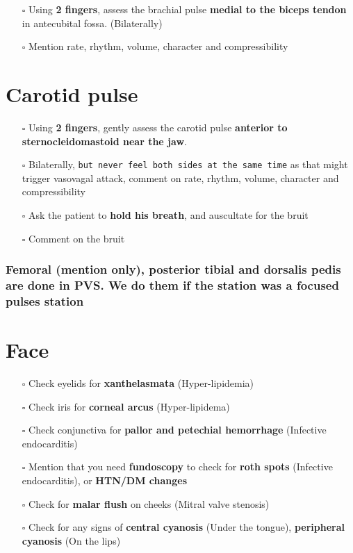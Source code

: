 \documentclass[
  13.5pt,
  a4paper,
  DIV=11,
  numbers=noendperiod]{scrreprt}
\providecommand{\tightlist}{%
  \setlength{\itemsep}{0pt}\setlength{\parskip}{0pt}}
\begin{document}
\begin{itemize}
\tightlist
\item[$\square$]
  Using \textbf{2 fingers}, assess the brachial pulse \textbf{medial to
  the biceps tendon} in antecubital fossa. (Bilaterally)
\item[$\square$]
  Mention rate, rhythm, volume, character and compressibility
\end{itemize}

\section{Carotid pulse}\label{carotid-pulse}

\begin{itemize}
\tightlist
\item[$\square$]
  Using \textbf{2 fingers}, gently assess the carotid pulse
  \textbf{anterior to sternocleidomastoid near the jaw}.
\item[$\square$]
  Bilaterally,
  \texttt{but\ never\ feel\ both\ sides\ at\ the\ same\ time} as that
  might trigger vasovagal attack, comment on rate, rhythm, volume,
  character and compressibility
\item[$\square$]
  Ask the patient to \textbf{hold his breath}, and auscultate for the
  bruit
\item[$\square$]
  Comment on the bruit
\end{itemize}

\subsubsection{Femoral (mention only), posterior tibial and dorsalis
pedis are done in PVS. We do them if the station was a focused pulses
station}\label{femoral-mention-only-posterior-tibial-and-dorsalis-pedis-are-done-in-pvs.-we-do-them-if-the-station-was-a-focused-pulses-station}

\section{Face}\label{face}

\begin{itemize}
\tightlist
\item[$\square$]
  Check eyelids for \textbf{xanthelasmata} (Hyper-lipidemia)
\item[$\square$]
  Check iris for \textbf{corneal arcus} (Hyper-lipidema)
\item[$\square$]
  Check conjunctiva for \textbf{pallor and petechial hemorrhage}
  (Infective endocarditis)
\item[$\square$]
  Mention that you need \textbf{fundoscopy} to check for \textbf{roth
  spots} (Infective endocarditis), or \textbf{HTN/DM changes}
\item[$\square$]
  Check for \textbf{malar flush} on cheeks (Mitral valve stenosis)
\item[$\square$]
  Check for any signs of \textbf{central cyanosis} (Under the tongue),
  \textbf{peripheral cyanosis} (On the lips)
\end{itemize}
\end{document}
